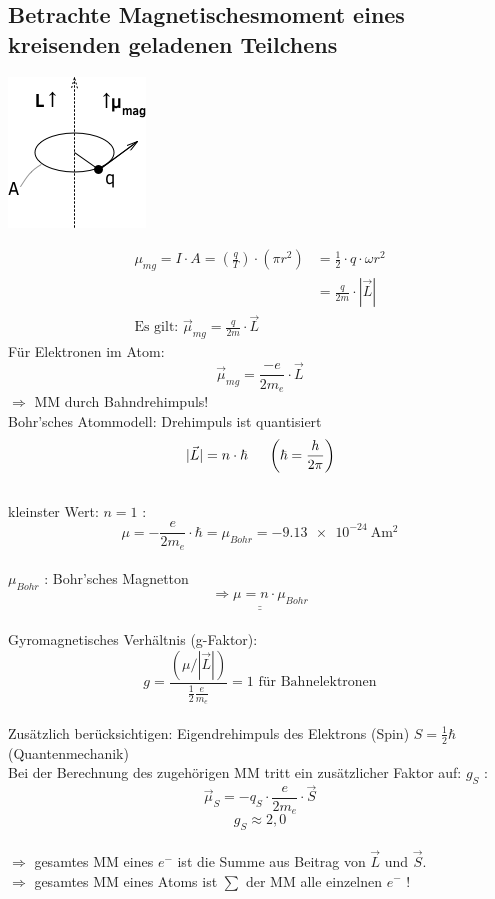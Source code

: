 \subsection{Betrachte Magnetischesmoment eines kreisenden geladenen Teilchens}
\begin{center}
\includegraphics[width=0.2\linewidth]{skizzen/17/17B01}
\end{center}
\begin{align*}
\mu_{mg} = I \cdot A = \left( \frac{q}{T} \right)  \cdot (\pi r^2) &= \frac{1}{2} \cdot q \cdot \omega r^2\\
&= \frac{q}{2m} \cdot |\vec{L}|\\
\text{Es gilt: } \vec{\mu}_{mg} = \frac{q}{2m} \cdot \vec{L}
\end{align*}
Für Elektronen im Atom:
$$ \boxed{\vec {\mu}_{mg} = \frac{-e}{2m_e} \cdot \vec{L} } $$
$ \Rightarrow $ MM durch Bahndrehimpuls!\\
Bohr'sches Atommodell: Drehimpuls ist quantisiert $$ |\vec{L}| = n\cdot \hbar \hspace{5mm} \left( \hbar = \frac{h}{2\pi}\right)  $$\\
kleinster Wert: $ n=1 $ : $$ \mu = -\frac{e}{2m_e}\cdot \hbar = \mu_{Bohr} = \SI{-9,13e-24}{\ampere\meter^2} $$\\
$ \mu_{Bohr} $ : Bohr'sches Magnetton $$ \underline{\underline{\Rightarrow \mu = n \cdot \mu_{Bohr}}} $$ \\
Gyromagnetisches Verhältnis (g-Faktor):
$$ g= \frac{(\mu/|\vec{L}|)}{\frac{1}{2}\frac{e}{m_e}} = 1 \text{ für Bahnelektronen} $$ \\
Zusätzlich berücksichtigen: Eigendrehimpuls des Elektrons (Spin) $ S=\frac{1}{2} \hbar $ (Quantenmechanik) \\
Bei der Berechnung des zugehörigen MM tritt ein zusätzlicher Faktor auf: $ g_S $ :
$$ \vec{\mu}_S = -q_S \cdot \frac{e}{2m_e} \cdot \vec{S} $$
$$ g_S \approx 2,0 $$ \\
$ \Rightarrow $ gesamtes MM eines $ e^- $ ist die Summe aus Beitrag von $ \vec{L} $ und $ \vec{S}$. \\
$ \Rightarrow $ gesamtes MM eines Atoms ist $ \sum $ der MM alle einzelnen $ e^- $ !\\
